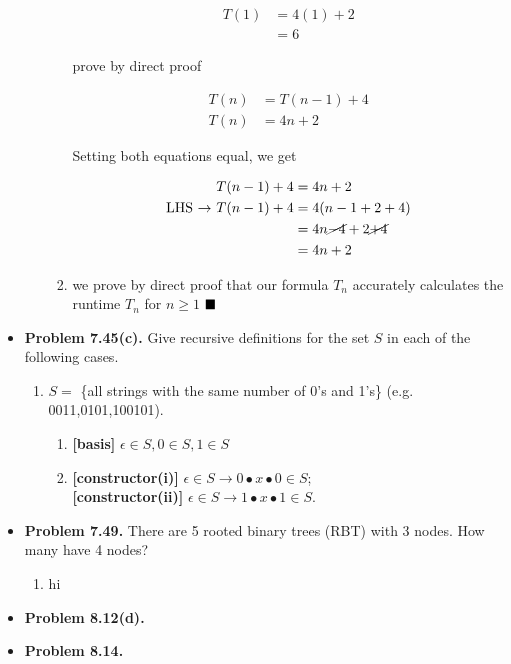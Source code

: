 \documentclass{article}
\begin{document}
\begin{itemize}
\begin{enumerate}[label=(\alph*)]
\begin{enumerate}[label=(\roman*)]
\begin{center}
                \end{center}
                \begin{align*}
                    T(1) &= 4(1) + 2\\
                         &= 6
                \end{align*}
                \begin{center}
                    prove by direct proof
                \end{center}
                \begin{align*}
                    T(n) &= T(n-1) + 4\\
                    T(n) &= 4n + 2
                \end{align*}
                \begin{center}
                    Setting both equations equal, we get
                \end{center}
                \begin{align*}
                    T(n-1) + 4 &= 4n + 2\\
                    \text{LHS $\rightarrow$ } T(n-1) + 4 &= 4(n-1 + 2 + 4)\\
                    &= 4n \cancel{-4} + 2 \cancel{+4}\\
                    &= 4n + 2
                \end{align*}
                \item we prove by direct proof that our formula $T_n$ accurately calculates the runtime $T_n$ for $n \geq 1$ $\hfill\blacksquare$
            \end{enumerate}
        \end{enumerate}
        \item \textbf{Problem 7.45(c).} Give recursive definitions for the set $S$ in each of the following cases.
        \begin{enumerate}[label=(c)]
            \item $S =$ \{all strings with the same number of 0's and 1's\} (e.g. 0011,0101,100101).
            \begin{enumerate}[label=\arabic*.]
                \item \textbf{[basis]} $\epsilon \in S, 0 \in S, 1 \in S$
                \item \textbf{[constructor(i)]} $\epsilon \in S \rightarrow 0 \bullet x \bullet 0 \in S$;\\
                \textbf{[constructor(ii)]} $\epsilon \in S \rightarrow 1 \bullet x \bullet 1 \in S$.
            \end{enumerate}
        \end{enumerate}
        \item \textbf{Problem 7.49.} There are 5 rooted binary trees (RBT) with 3 nodes. How many have 4 nodes?
        \begin{enumerate}
            \item hi
        \end{enumerate}
        \item \textbf{Problem 8.12(d).}
        \item \textbf{Problem 8.14.}
    \end{itemize}
    
\end{document}
